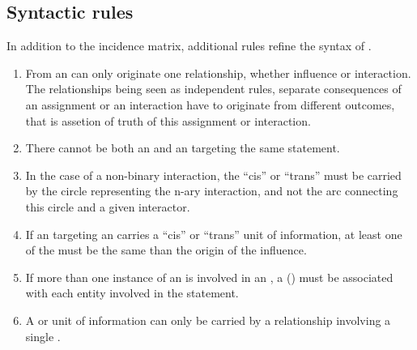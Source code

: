 
\subsection{Syntactic rules}
\label{sec:SyntacticRules}

In addition to the incidence matrix, additional rules refine the syntax of \ERs.


\begin{enumerate}
\item From an  can only originate one relationship, whether influence or interaction. The relationships being seen as independent rules, separate consequences of an assignment or an interaction have to originate from different outcomes, that is assetion of truth of this assignment or interaction.
\item There cannot be both an  and an  targeting the same statement.
\item In the case of a non-binary interaction, the ``cis'' or ``trans''  must be carried by the circle representing the n-ary interaction, and not the arc connecting this circle and a given interactor.
\item If an  targeting an  carries a ``cis'' or ``trans'' unit of information, at least one of the  must be the same  than the origin of the influence. 
\item If more than one instance of an  is involved in an , a   () must be associated with each entity involved in the statement.
\item A  or  unit of information can only be carried by a relationship involving a single .
\end{enumerate}  

